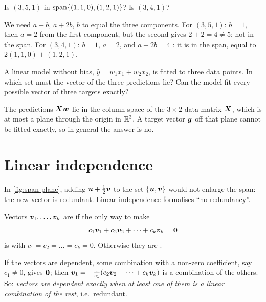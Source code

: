 \begin{exercise}
Is $(3, 5, 1)$ in $\operatorname{span}\{(1, 1, 0), (1, 2, 1)\}$? Is $(3, 4, 1)$?
\end{exercise}
\begin{solution}
We need $a + b$, $a + 2b$, $b$ to equal the three components. For
$(3, 5, 1)$: $b = 1$, then $a = 2$ from the first component, but the second
gives $2 + 2 = 4 \neq 5$: not in the span. For $(3, 4, 1)$: $b = 1$, $a = 2$,
and $a + 2b = 4$ \checkmark: it is in the span, equal to $2(1,1,0) + (1,2,1)$.
\end{solution}

\begin{exercise}
A linear model without bias, $\hat y = w_1x_1 + w_2x_2$, is fitted to three
data points. In which set must the vector of the three predictions lie? Can
the model fit every possible vector of three targets exactly?
\end{exercise}
\begin{solution}
The predictions $\bm{X}\bm{w}$ lie in the column space of the $3\times2$ data matrix
$\bm{X}$, which is at most a plane through the origin in $\mathbb{R}^3$. A target vector
$\bm{y}$ off that plane cannot be fitted exactly, so in general the answer is no.
\end{solution}

\section{Linear independence}\label{sec:independence}

In \cref{fig:span-plane}, adding $\bm{u} + \frac12\bm{v}$ to the set $\{\bm{u}, \bm{v}\}$
would not enlarge the span: the new vector is redundant. Linear independence
formalises ``no redundancy''.

\begin{definition}\label{def:linear-independence}
Vectors $\bm{v}_1, \dots, \bm{v}_k$ are  if the only way to make
\[
  c_1\bm{v}_1 + c_2\bm{v}_2 + \dots + c_k\bm{v}_k = \bm{0}
\]
is with $c_1 = c_2 = \dots = c_k = 0$. Otherwise they are .
\end{definition}

If the vectors are dependent, some combination with a non-zero coefficient,
say $c_1 \neq 0$, gives $\bm{0}$; then
$\bm{v}_1 = -\frac{1}{c_1}(c_2\bm{v}_2 + \dots + c_k\bm{v}_k)$ is a combination of the
others. So: \emph{vectors are dependent exactly when at least one of them is a
linear combination of the rest}, i.e.\ redundant.

